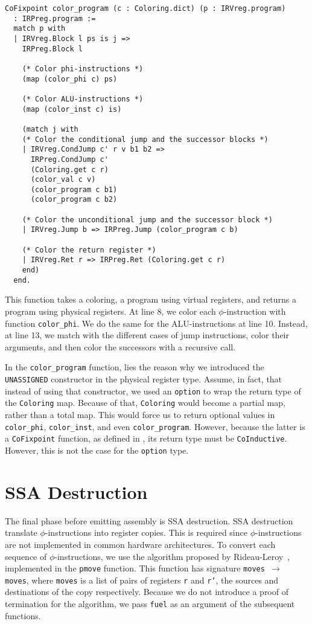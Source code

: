 \begin{lstlisting}[style=Rocq]
CoFixpoint color_program (c : Coloring.dict) (p : IRVreg.program)
  : IRPreg.program :=
  match p with
  | IRVreg.Block l ps is j =>
    IRPreg.Block l

    (* Color phi-instructions *)
    (map (color_phi c) ps)

    (* Color ALU-instructions *)
    (map (color_inst c) is)

    (match j with
    (* Color the conditional jump and the successor blocks *)
    | IRVreg.CondJump c' r v b1 b2 =>
      IRPreg.CondJump c'
      (Coloring.get c r)
      (color_val c v)
      (color_program c b1)
      (color_program c b2)

    (* Color the unconditional jump and the successor block *)
    | IRVreg.Jump b => IRPreg.Jump (color_program c b)

    (* Color the return register *)
    | IRVreg.Ret r => IRPreg.Ret (Coloring.get c r)
    end)
  end.
\end{lstlisting}

This function takes a coloring, a program using virtual registers, and returns a program using physical registers. At line 8, we color each $\phi$-instruction with function \texttt{color\_phi}. We do the same for the ALU-instructions at line 10. Instead, at line 13, we match with the different cases of jump instructions, color their arguments, and then color the successors with a recursive call.

In the \texttt{color\_program} function, lies the reason why we introduced the \texttt{UNASSIGNED} constructor in the physical register type. Assume, in fact, that instead of using that constructor, we used an \texttt{option} to wrap the return type of the \texttt{Coloring} map. Because of that, \texttt{Coloring} would become a partial map, rather than a total map. This would force us to return optional values in \texttt{color\_phi}, \texttt{color\_inst}, and even \texttt{color\_program}. However, because the latter is a \texttt{CoFixpoint} function, as defined in , its return type must be \texttt{CoInductive}. However, this is not the case for the \texttt{option} type.

\section{SSA Destruction}
\label{sec:destruct}

The final phase before emitting assembly is SSA destruction. SSA destruction translate $\phi$-instructions into register copies. This is required since $\phi$-instructions are not implemented in common hardware architectures.
To convert each sequence of $\phi$-instructions, we use the algorithm proposed by Rideau-Leroy~\cite{Rideau-Leroy-regalloc}, implemented in the \texttt{pmove} function. This function has signature \texttt{moves $\to$ moves}, where \texttt{moves} is a list of pairs of registers \texttt r and \texttt{r'}, the sources and destinations of the copy respectively.
Because we do not introduce a proof of termination for the algorithm, we pass \texttt{fuel} as an argument of the subsequent functions.

